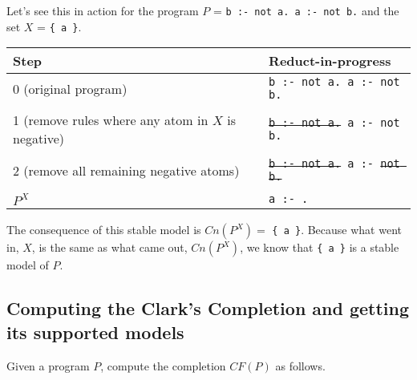 \documentclass[9pt,a4paper,landscape]{article}
\begin{document}
{\noindent Let's see this in action for the program $P$ = \texttt{b :- not a. a :- not b.} and the set $X$ = \texttt{\{ a \}}.

\begin{center}
	\begin{tabular}{p{5cm}p{5cm}}
		Step & Reduct-in-progress \\ \midrule
		
		0 (original program)	& \texttt{b :- not a. \newline a :- not b.} \\&\\
		
		1 (remove rules where any atom in $X$ is negative) & \texttt{\sout{b :- not a.} \newline a :- not b.} \\&\\
		
		2 (remove all remaining negative atoms)	& \texttt{\sout{b :- not a.} \newline a :- \sout{not b.}} \\&\\
		
		$P^X$ & \texttt{a :- .}
	\end{tabular}
\end{center}

\noindent The consequence of this stable model is $Cn(P^X) =$ \texttt{\{ a \}}.
Because what went in, $X$, is the same as what came out, $Cn(P^X)$, we know that \texttt{\{ a \}} is a stable model of $P$.


\pagebreak


\subsection{Computing the Clark's Completion and getting its supported models}
\label{subsec:compl-supp}

Given a program $P$, compute the completion $CF(P)$ as follows.

}
\end{document}

